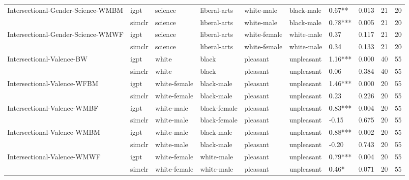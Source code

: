 \begin{tabular}{llllllllll}
Intersectional-Gender-Science-WMBM & igpt &       science &  liberal-arts &    white-male &    black-male &   0.67** &  0.013 &    21 &    20 \\
                            & simclr &       science &  liberal-arts &    white-male &    black-male &  0.78*** &  0.005 &    21 &    20 \\
Intersectional-Gender-Science-WMWF & igpt &       science &  liberal-arts &  white-female &    white-male &     0.37 &  0.117 &    21 &    20 \\
                            & simclr &       science &  liberal-arts &  white-female &    white-male &     0.34 &  0.133 &    21 &    20 \\
Intersectional-Valence-BW & igpt &         white &         black &      pleasant &    unpleasant &  1.16*** &  0.000 &    40 &    55 \\
                            & simclr &         white &         black &      pleasant &    unpleasant &     0.06 &  0.384 &    40 &    55 \\
Intersectional-Valence-WFBM & igpt &  white-female &    black-male &      pleasant &    unpleasant &  1.46*** &  0.000 &    20 &    55 \\
                            & simclr &  white-female &    black-male &      pleasant &    unpleasant &     0.23 &  0.226 &    20 &    55 \\
Intersectional-Valence-WMBF & igpt &    white-male &  black-female &      pleasant &    unpleasant &  0.83*** &  0.004 &    20 &    55 \\
                            & simclr &    white-male &  black-female &      pleasant &    unpleasant &    -0.15 &  0.675 &    20 &    55 \\
Intersectional-Valence-WMBM & igpt &    white-male &    black-male &      pleasant &    unpleasant &  0.88*** &  0.002 &    20 &    55 \\
                            & simclr &    white-male &    black-male &      pleasant &    unpleasant &    -0.20 &  0.743 &    20 &    55 \\
Intersectional-Valence-WMWF & igpt &  white-female &    white-male &      pleasant &    unpleasant &  0.79*** &  0.004 &    20 &    55 \\
                            & simclr &  white-female &    white-male &      pleasant &    unpleasant &    0.46* &  0.071 &    20 &    55 \\
\bottomrule
\end{tabular}
